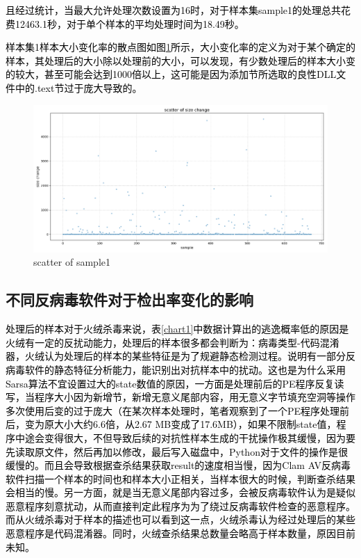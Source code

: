 \textcolor{black}{且经过统计，当最大允许处理次数设置为16时，对于样本集sample1的处理总共花费12463.1秒，对于单个样本的平均处理时间为18.49秒。}

\textcolor{black}{样本集1样本大小变化率的散点图如图\ref{fig:scatter_of_sample1}所示，大小变化率的定义为对于某个确定的样本，其处理后的大小除以处理前的大小，可以发现，有少数处理后的样本大小变的较大，甚至可能会达到1000倍以上，这可能是因为添加节所选取的良性DLL文件中的.text节过于庞大导致的。}

\begin{figure}
  \centering
  \includegraphics[]{images/scatter_of_sample1.png}
  \caption{scatter of sample1}\label{fig:scatter_of_sample1}
\end{figure}

\subsection{不同反病毒软件对于检出率变化的影响}

\textcolor{black}{处理后的样本对于火绒杀毒来说，表\ref{chart1}中数据计算出的逃逸概率低的原因是火绒有一定的反扰动能力，处理后的样本很多都会判断为：病毒类型-代码混淆器，火绒认为处理后的样本的某些特征是为了规避静态检测过程。说明有一部分反病毒软件的静态特征分析能力，能识别出对抗样本中的扰动。这也是为什么采用Sarsa算法不宜设置过大的state数值的原因，一方面是处理前后的PE程序反复读写，当程序大小因为新增节，新增无意义尾部内容，用无意义字节填充空洞等操作多次使用后变的过于庞大（在某次样本处理时，笔者观察到了一个PE程序处理前后，变为原大小大约6.6倍，从2.67 MB变成了17.6MB），如果不限制state值，程序中途会变得很大，不但导致后续的对抗性样本生成的干扰操作极其缓慢，因为要先读取原文件，然后再加以修改，最后写入磁盘中，Python对于文件的操作是很缓慢的。而且会导致根据查杀结果获取result的速度相当慢，因为Clam AV反病毒软件扫描一个样本的时间也和样本大小正相关，当样本很大的时候，判断查杀结果会相当的慢。另一方面，就是当无意义尾部内容过多，会被反病毒软件认为是疑似恶意程序刻意扰动，从而直接判定此程序为为了绕过反病毒软件检查的恶意程序。而从火绒杀毒对于样本的描述也可以看到这一点，火绒杀毒认为经过处理后的某些恶意程序是代码混淆器。同时，火绒查杀结果总数量会略高于样本数量，原因目前未知。}

